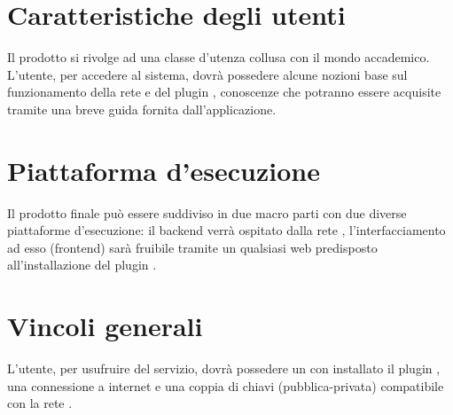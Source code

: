 \documentclass[AnalisiDeiRequisiti.tex]{subfiles}
\begin{document}
\section{Caratteristiche degli utenti}
Il prodotto si rivolge ad una classe d'utenza collusa con il mondo accademico.\\
L'utente, per accedere al sistema, dovrà possedere alcune nozioni base sul funzionamento della rete  e del plugin , conoscenze che potranno essere acquisite tramite una breve guida fornita dall'applicazione.

\section{Piattaforma d'esecuzione}
Il prodotto finale può essere suddiviso in due macro parti con due diverse piattaforme d'esecuzione: il backend verrà ospitato dalla rete , l'interfacciamento ad esso (frontend) sarà fruibile tramite un qualsiasi  web predisposto all'installazione del plugin .

\section{Vincoli generali}
L'utente, per usufruire del servizio, dovrà possedere un  con installato il plugin , una connessione a internet e una coppia di chiavi (pubblica-privata) compatibile con la rete .	
\end{document}
